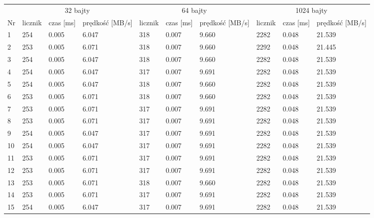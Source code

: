 \documentclass[oneside]{mgr}
\begin{document}
\begin{table}

\centering
        \begin{tabularx}{\linewidth}{|X|X|X|X|X|X|X|X|X|X|}
        \hline 
         & \multicolumn{3}{|c|}{32 bajty} & \multicolumn{3}{|c|}{64 bajty} & \multicolumn{3}{|c|}{1024 bajty} \\
        \cline{2-10}
{\fontsize{10}{12}\selectfont Nr} & {\fontsize{10}{12}\selectfont licznik} &  {\fontsize{10}{12}\selectfont czas [ms]} & {\fontsize{10}{12}\selectfont prędkość [MB/s]} & {\fontsize{10}{12}\selectfont licznik} & {\fontsize{10}{12}\selectfont czas [ms]} &{\fontsize{10}{12}\selectfont prędkość [MB/s]} & {\fontsize{10}{12}\selectfont licznik} &{\fontsize{10}{12}\selectfont czas [ms]} &{\fontsize{10}{12}\selectfont prędkość [MB/s]} \\
            \hline
1	& 254 &	0.005 &	6.047 &	318 &	0.007 &	9.660 &	2282 &	0.048 &	21.539 \\ \hline
2	& 253 &	0.005 &	6.071 &	318 &	0.007 &	9.660 &	2292 &	0.048 &	21.445 \\ \hline
3	& 254 &	0.005 &	6.047 &	318 &	0.007 &	9.660 &	2282 &	0.048 &	21.539 \\ \hline
4	& 254 &	0.005 &	6.047 &	317 &	0.007 &	9.691 &	2282 &	0.048 &	21.539 \\ \hline
5	& 254 &	0.005 &	6.047 &	318 &	0.007 &	9.660 &	2282 &	0.048 &	21.539 \\ \hline
6	& 253 &	0.005 &	6.071 &	318 &	0.007 &	9.660 &	2282 &	0.048 &	21.539 \\ \hline
7	& 253 &	0.005 &	6.071 &	317 &	0.007 &	9.691 &	2282 &	0.048 &	21.539 \\ \hline
8	& 253 &	0.005 &	6.071 &	317 &	0.007 &	9.691 &	2282 &	0.048 &	21.539 \\ \hline
9	& 254 &	0.005 &	6.047 &	317 &	0.007 &	9.691 &	2282 &	0.048 &	21.539 \\ \hline
10 &	254	& 0.005	& 6.047	& 317	& 0.007 &	9.691 &	2282 &	0.048 &	21.539 \\ \hline
11 &	253	& 0.005	& 6.071	& 317	& 0.007 &	9.691 &	2282 &	0.048 &	21.539 \\ \hline
12 &	253	& 0.005	& 6.071	& 317	& 0.007 &	9.691 &	2282 &	0.048 &	21.539 \\ \hline
13 &	253	& 0.005	& 6.071	& 318	& 0.007 &	9.660 &	2282 &	0.048 &	21.539 \\ \hline
14 &	253	& 0.005	& 6.071	& 317	& 0.007 &	9.691 &	2282 &	0.048 &	21.539 \\ \hline
15 &	254	& 0.005	& 6.047	& 317	& 0.007 &	9.691 &	2282 &	0.048 &	21.539 \\ \hline

\end{tabularx}
\end{table}
\end{document}
